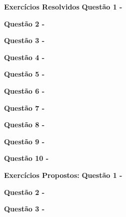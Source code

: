 \textbf{Exercícios Resolvidos}
    \vspace{0.5cm}\textbf{Questão 1 -}
    
    
    
    \vspace{0.5cm}\textbf{Questão 2 -}
    
    
    
    \vspace{0.5cm}\textbf{Questão 3 -}
    
    
    
    \vspace{0.5cm}\textbf{Questão 4 -}
    
    
    
    \vspace{0.5cm}\textbf{Questão 5 -}
    
    
    
    \vspace{0.5cm}\textbf{Questão 6 -}
    
    
    
    \vspace{0.5cm}\textbf{Questão 7 -}
    
    

    \vspace{0.5cm}\textbf{Questão 8 -}
    
    
    
    \vspace{0.5cm}\textbf{Questão 9 -}
    
    
    
    \vspace{0.5cm}\textbf{Questão 10 -}
    
    
    \newpage
    \textbf{Exercícios Propostos:}
    \vspace{0.5cm}\textbf{Questão 1 -}
    
    \vspace{0.5cm}\textbf{Questão 2 -}
    
    \vspace{0.5cm}\textbf{Questão 3 -}
    
